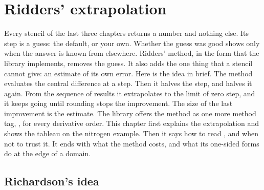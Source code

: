 \chapter{Ridders' extrapolation}\label{ch:ridders}

Every stencil of the last three chapters returns a number and nothing else. Its step is a guess: the default, or
your own. Whether the guess was good shows only when the answer is known from elsewhere. Ridders'
method,\cite{ridders1982} in the form that the library implements, removes the guess. It also adds the one thing
that a stencil cannot give: an estimate of its own error. Here is the idea in brief. The method evaluates the central
difference at a step. Then it halves the step, and halves it again. From the sequence of results it extrapolates to
the limit of zero step, and it keeps going until rounding stops the improvement. The size of the last improvement is
the estimate. The library offers the method as one more method tag, , for every
derivative order. This chapter first explains the extrapolation and shows the tableau on the nitrogen example. Then
it says how to read , and when not to trust it. It ends with what the method costs, and what its
one-sided forms do at the edge of a domain.

\section{Richardson's idea}\label{sec:ridders-richardson}

